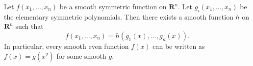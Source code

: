 Let $f(x_1, \ldots, x_n)$ be a smooth symmetric function on $\mathbf{R}^n$. Let $g_i(x_1, \ldots, x_n)$ be the elementary symmetric polynomials. Then there exists a smooth function $h$ on $\mathbf{R}^n$ such that
$$f(x_1, \ldots, x_n) = h(g_1(x), \ldots, g_n(x)).$$
In particular, every smooth even function $f(x)$ can be written as $f(x) = g(x^2)$ for some smooth $g$.
